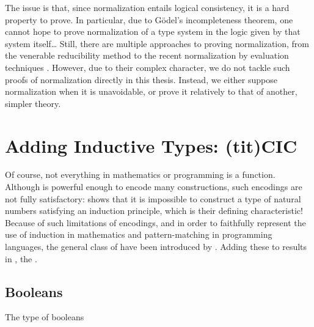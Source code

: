 The issue is that, since normalization entails logical consistency, it is a hard
property to prove. In particular, due to Gödel’s incompleteness theorem, one cannot hope
to prove normalization of a type system in the logic given by that system itself…
Still, there are multiple approaches to proving normalization, from the venerable
reducibility method  to the recent normalization by evaluation 
techniques . However, due to their complex character, 
we do not tackle such proofs of normalization directly in this thesis. Instead, we
either suppose normalization when it is unavoidable,
or prove it relatively to that of another, simpler theory.

\section{Adding Inductive Types: \kl(tit){CIC}}
\label{sec:tech-cic}

\AP Of course, not everything in mathematics or programming is a function.
Although  is powerful enough to encode many constructions,%
such encodings are not fully satisfactory:  shows
that it is impossible to construct a type of natural numbers
satisfying an induction principle, which is their defining characteristic!
Because of such limitations of encodings, and in order to faithfully
represent the use of induction in mathematics and pattern-matching in programming languages,
the general class of  have been introduced
by .%
%
Adding these to  results in ,
the .

\subsection{Booleans}

\begin{marginfigure}
  \ContinuedFloat*
  \caption{The type of booleans}
  \label{fig:bool-type}
\end{marginfigure}

